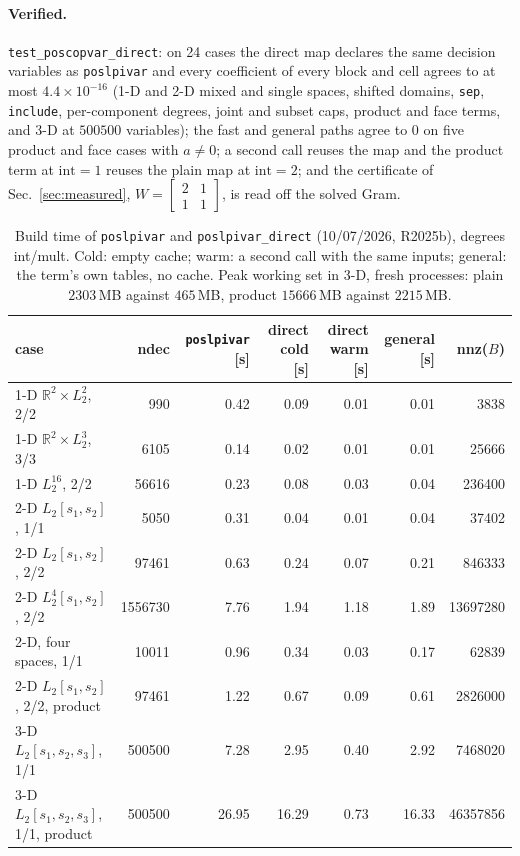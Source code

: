 \documentclass[12pt]{article}
\newcommand{\R}{\mathbb{R}}
\newcommand{\bmat}[1]{\begin{bmatrix} #1 \end{bmatrix}}
\newcommand{\code}[1]{\texttt{#1}}
\theoremstyle{plain}
\theoremstyle{definition}
\theoremstyle{remark}
\begin{document}
\paragraph{Verified.} \code{test\_poscopvar\_direct}: on 24 cases the direct map declares the same decision variables as \code{poslpivar} and every coefficient of every block and cell agrees to at most $4.4\times10^{-16}$ (1-D and 2-D mixed and single spaces, shifted domains, \code{sep}, \code{include}, per-component degrees, joint and subset caps, product and face terms, and 3-D at $500500$ variables); the fast and general paths agree to $0$ on five product and face cases with $a\ne0$; a second call reuses the map and the product term at $\mathrm{int}=1$ reuses the plain map at $\mathrm{int}=2$; and the certificate of Sec.~\ref{sec:measured}, $W=\bmat{2&1\\1&1}$, is read off the solved Gram.

\begin{table}[h]\centering\scriptsize
\setlength{\tabcolsep}{3pt}
\begin{tabular}{lrrrrrr}
\toprule
case & ndec & \code{poslpivar} [s] & direct cold [s] & direct warm [s] & general [s] & nnz($B$) \\
\midrule
1-D $\R^2\times L_2^2$, 2/2 & 990 & 0.42 & 0.09 & 0.01 & 0.01 & 3838 \\
1-D $\R^2\times L_2^3$, 3/3 & 6105 & 0.14 & 0.02 & 0.01 & 0.01 & 25666 \\
1-D $L_2^{16}$, 2/2 & 56616 & 0.23 & 0.08 & 0.03 & 0.04 & 236400 \\
2-D $L_2[s_1,s_2]$, 1/1 & 5050 & 0.31 & 0.04 & 0.01 & 0.04 & 37402 \\
2-D $L_2[s_1,s_2]$, 2/2 & 97461 & 0.63 & 0.24 & 0.07 & 0.21 & 846333 \\
2-D $L_2^4[s_1,s_2]$, 2/2 & 1556730 & 7.76 & 1.94 & 1.18 & 1.89 & 13697280 \\
2-D, four spaces, 1/1 & 10011 & 0.96 & 0.34 & 0.03 & 0.17 & 62839 \\
2-D $L_2[s_1,s_2]$, 2/2, product & 97461 & 1.22 & 0.67 & 0.09 & 0.61 & 2826000 \\
3-D $L_2[s_1,s_2,s_3]$, 1/1 & 500500 & 7.28 & 2.95 & 0.40 & 2.92 & 7468020 \\
3-D $L_2[s_1,s_2,s_3]$, 1/1, product & 500500 & 26.95 & 16.29 & 0.73 & 16.33 & 46357856 \\
\bottomrule
\end{tabular}
\caption{Build time of \code{poslpivar} and \code{poslpivar\_direct} (10/07/2026, R2025b), degrees int/mult. Cold: empty cache; warm: a second call with the same inputs; general: the term's own tables, no cache. Peak working set in 3-D, fresh processes: plain $2303$\,MB against $465$\,MB, product $15666$\,MB against $2215$\,MB.}\label{tab:direct}
\end{table}
\end{document}
